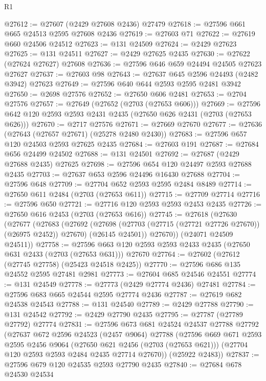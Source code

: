 \begin{lexlean}{R1}
\begin{coremodule}
@27612 := @27607 (@2429 @27608 @2436) @27479
@27618 := @27596 @661 @665 @24513 @2595 @27608 @2436
@27619 := @27603 @71
@27622 := @27619 @660 @24506 @24512
@27623 := @131 @24509
@27624 := @2429 @27623
@27625 := @131 @24511
@27627 := @2429 @27625 @2435
@27630 := @27622 (@27624 @27627) @27608
@27636 := @27596 @646 @659 @24494 @24505 @27623 @27627
@27637 := @27603 @98
@27643 := @27637 @645 @2596 @24493 (@2482 @3942) @27623
@27649 := @27596 @640 @644 @2593 @2595 @2481 @3942
@27650 := @2698 @27576
@27652 := @27650 @606 @2481
@27653 := @2704 @27576
@27657 := @27649 (@27652 (@2703 (@27653 @606)))
@27669 := @27596 @642 @120 @2593 @2593 @2431 @2435 (@27650 @626 @2431 (@2703 (@27653 @626)))
@27670 := @2717 @27576
@27671 := @27669 @27670
@27677 := @27636 (@27643 (@27657 @27671) (@25278 @2480 @2430))
@27683 := @27596 @657 @120 @24503 @2593 @27625 @2435
@27684 := @27603 @191
@27687 := @27684 @656 @24499 @24502
@27688 := @131 @24501
@27692 := @27687 (@2429 @27688 @2435) @27625
@27698 := @27596 @654 @120 @24497 @2593 @27688 @2435
@27703 := @27637 @653 @2596 @24496 @16430 @27688
@27704 := @27596 @648
@27709 := @27704 @652 @2593 @2595 @2484 @8489
@27714 := @27650 @611 @2484 (@2703 (@27653 @611))
@27715 := @27709 @27714
@27716 := @27596 @650
@27721 := @27716 @120 @2593 @2593 @2453 @2435
@27726 := @27650 @616 @2453 (@2703 (@27653 @616))
@27745 := @27618
    (@27630
      (@27677
        (@27683
          (@27692
            (@27698 (@27703 (@27715 (@27721 @27726 @27670)) (@26975 @2452)) @27670)
            (@26145 @24501))
          @27670))
      (@24071 @24509 @24511))
@27758 := @27596 @663 @120 @2593 @2593 @2433 @2435 (@27650 @631 @2433 (@2703 (@27653 @631))) @27670
@27764 := @27602 (@27612 (@27745 @27758) (@25423 @24518 @2425))
@27770 := @27596 @686 @135 @24552 @2595 @27481 @2981
@27773 := @27604 @685 @24546 @24551
@27774 := @131 @24549
@27778 := @27773 (@2429 @27774 @2436) @27481
@27784 := @27596 @683 @665 @24544 @2595 @27774 @2436
@27787 := @27619 @682 @24538 @24543
@27788 := @131 @24540
@27789 := @2429 @27788
@27790 := @131 @24542
@27792 := @2429 @27790 @2435
@27795 := @27787 (@27789 @27792) @27774
@27831 := @27596
    @673
    @681
    @24524
    @24537
    @27788
    @27792
    (@27637
      @672
      @2596
      @24523
      (@2457 @9064)
      @27788
      (@27596
        @669
        @671
        @2593
        @2595
        @2456
        @9064
        (@27650 @621 @2456 (@2703 (@27653 @621)))
        (@27704 @120 @2593 @2593 @2484 @2435 @27714 @27670))
      (@25922 @2483))
@27837 := @27596 @679 @120 @24535 @2593 @27790 @2435
@27840 := @27684 @678 @24530 @24534

\end{coremodule}
\end{lexlean}
